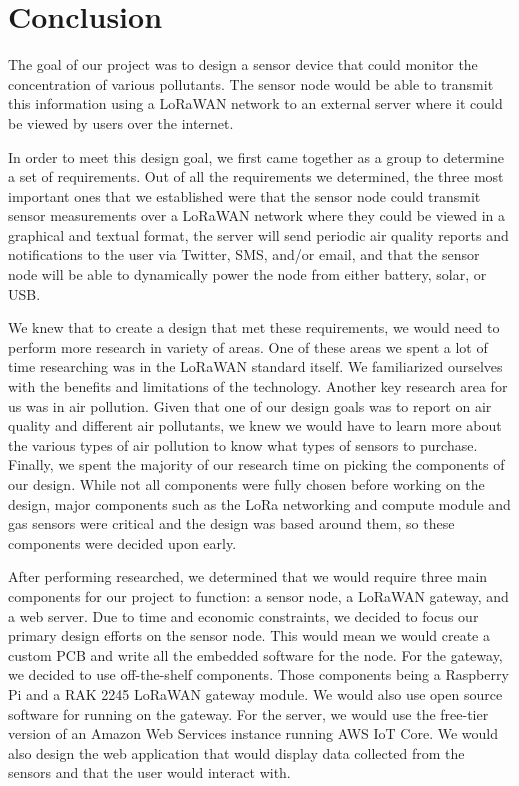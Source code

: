 \section{Conclusion}
The goal of our project was to design a sensor device that could monitor the concentration of various pollutants. The sensor node would be able to transmit this information using a LoRaWAN network to an external server where it could be viewed by users over the internet.

In order to meet this design goal, we first came together as a group to determine a set of requirements. Out of all the requirements we determined, the three most important ones that we established were that the sensor node could transmit sensor measurements over a LoRaWAN network where they could be viewed in a graphical and textual format, the server will send periodic air quality reports and notifications to the user via Twitter, SMS, and/or email, and that the sensor node will be able to dynamically power the node from either battery, solar, or USB. 

We knew that to create a design that met these requirements, we would need to perform more research in variety of areas. One of these areas we spent a lot of time researching was in the LoRaWAN standard itself. We familiarized ourselves with the benefits and limitations of the technology. Another key research area for us was in air pollution. Given that one of our design goals was to report on air quality and different air pollutants, we knew we would have to learn more about the various types of air pollution to know what types of sensors to purchase. Finally, we spent the majority of our research time on picking the components of our design. While not all components were fully chosen before working on the design, major components such as the LoRa networking and compute module and gas sensors were critical and the design was based around them, so these components were decided upon early.

After performing researched, we determined that we would require three main components for our project to function: a sensor node, a LoRaWAN gateway, and a web server. Due to time and economic constraints, we decided to focus our primary design efforts on the sensor node. This would mean we would create a custom PCB and write all the embedded software for the node. For the gateway, we decided to use off-the-shelf components. Those components being a Raspberry Pi and a RAK 2245 LoRaWAN gateway module. We would also use open source software for running on the gateway. For the server, we would use the free-tier version of an Amazon Web Services instance running AWS IoT Core. We would also design the web application that would display data collected from the sensors and that the user would interact with.


